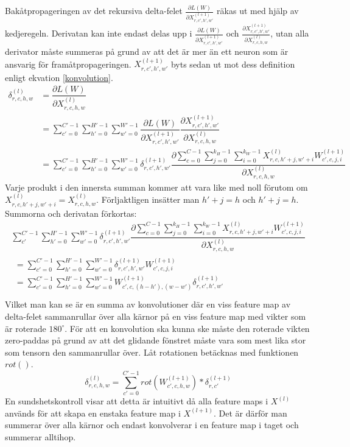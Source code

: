 \documentclass[a4paper,11pt,twoside]{article}
\newcommand*{\pd}[2]{\ensuremath{\dfrac{\partial #1}{\partial #2}}}
\newcommand*{\inpd}[2]{\ensuremath{\frac{\partial #1}{\partial #2}}}
\begin{document}
Bakåtpropageringen av det rekursiva delta-felet $\inpd{L(W)}{X^{(l+1)}_{r,c',h',w'}}$ räkas ut med hjälp av kedjeregeln. Derivatan kan inte endast delas upp i $\inpd{L(W)}{X^{(l+1)}_{r,c',h',w'}}$ och $\inpd{X^{(l+1)}_{r,c',h',w'}}{X^{(l)}_{r,c,h,w}}$, utan alla derivator måste summeras på grund av att det är mer än ett neuron som är ansvarig för framåtpropageringen. $X^{(l+1)}_{r,c',h',w'}$ byts sedan ut mot dess definition enligt ekvation \eqref{konvolution}. \cite{convmath} \cite{webconv1} \cite{webconv2} \cite{webconv3}
\begin{equation}\label{konvolutionbackprop}
\begin{split}
	\delta^{(l)}_{r,c,h,w}
		& = \pd{L(W)}{X^{(l)}_{r,c,h,w}} \\
		& = \sum^{C'-1}_{c'=0} \sum^{H'-1}_{h'=0} \sum^{W'-1}_{w'=0} \pd{L(W)}{X^{(l+1)}_{r,c',h',w'}} \pd{X^{(l+1)}_{r,c',h',w'}}{X^{(l)}_{r,c,h,w}} \\
		& = \sum^{C'-1}_{c'=0} \sum^{H'-1}_{h'=0} \sum^{W'-1}_{w'=0} \delta^{(l+1)}_{r,c',h',w'} \pd{\sum^{C-1}_{c=0} \sum^{k_H-1}_{j=0} \sum^{k_W-1}_{i=0} X^{(l)}_{r, c, h'+j, w'+i}W^{(l+1)}_{c', c, j, i}}{X^{(l)}_{r,c,h,w}}
\end{split}
\end{equation}
Varje produkt i den innersta summan kommer att vara like med noll förutom om $X^{(l)}_{r, c, h'+j, w'+i} = X^{(l)}_{r,c,h,w}$. Förljaktligen insätter man $h'+j = h$ och $h'+j = h$. Summorna och derivatan förkortas: \cite{webconv1} \cite{webconv2} \cite{webconv3}
\begin{multline}
\sum^{C'-1}_{c'} \sum^{H'-1}_{h'=0} \sum^{W'-1}_{w'=0} \delta^{(l+1)}_{r,c',h',w'} \pd{\sum^{C-1}_{c=0} \sum^{k_H-1}_{j=0} \sum^{k_W-1}_{i=0} X^{(l)}_{r, c, h'+j, w'+i}W^{(l+1)}_{c', c, j, i}}{X^{(l)}_{r,c,h,w}} \\
	\begin{split}
	 = \sum^{C'-1}_{c'=0} \sum^{H'-1}_{h'=0} \sum^{W'-1}_{w'=0} \delta^{(l+1)}_{r,c',h',w'} W^{(l+1)}_{c', c, j, i} \\
	 = \sum^{C'-1}_{c'=0} \sum^{H'-1}_{h'=0} \sum^{W'-1}_{w'=0} W^{(l+1)}_{c', c, (h-h'), (w-w')}  \delta^{(l+1)}_{r,c',h',w'}   \\
	 \end{split}
\end{multline}
Vilket man kan se är en summa av konvolutioner där en viss feature map av delta-felet sammanrullar över alla kärnor på en viss feature map med vikter som är roterade $180^\circ$. För att en konvolution ska kunna ske måste den roterade vikten zero-paddas på grund av att det glidande fönstret måste vara som mest lika stor som tensorn den sammanrullar över. Låt rotationen betäcknas med funktionen $rot()$. \cite{webconv1} \cite{webconv2} \cite{webconv3}
\begin{equation}
\delta^{(l)}_{r,c,h,w} = \sum^{C'-1}_{c'=0} rot(W^{(l+1)}_{c',c,h,w}) * \delta^{(l+1)}_{r,c'}
\end{equation}
En sundshetskontroll visar att detta är intuitivt då alla feature maps i $X^{(l)}$ används för att skapa en enstaka feature map i $X^{(l+1)}$. Det är därför man summerar över alla kärnor och endast konvolverar i en feature map i taget och summerar alltihop.
\end{document}
